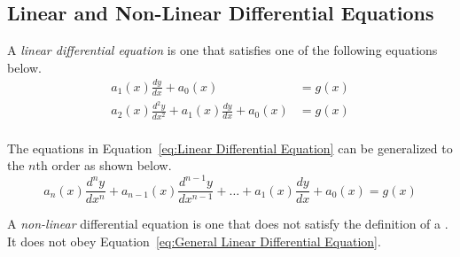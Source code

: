 \subsection{Linear and Non-Linear Differential Equations} \label{Linear vs. Non-Linear Differential Equations}
\begin{definition} \label{def:Linear Differential Equation}
  A \emph{linear differential equation} is one that satisfies one of the following equations below.
  \begin{equation} \label{eq:Linear Differential Equation}
    \begin{aligned}
      a_{1} \left( x \right) \frac{dy}{dx} + a_{0} \left( x \right) &= g \left( x \right) \\
      a_{2} \left( x \right) \frac{d^{2}y}{dx^{2}} + a_{1} \left( x \right) \frac{dy}{dx} + a_{0} \left( x \right) &= g \left( x \right) \\
    \end{aligned}
  \end{equation}
  \begin{remark}
    The equations in Equation~\eqref{eq:Linear Differential Equation} can be generalized to the $n$th order as shown below.
    \begin{equation} \label{eq:General Linear Differential Equation}
      a_{n} \left( x \right) \frac{d^{n}y}{dx^{n}} + a_{n-1} \left( x \right) \frac{d^{n-1}y}{dx^{n-1}} + \ldots + a_{1} \left( x \right) \frac{dy}{dx} + a_{0} \left( x \right) = g \left( x \right)
    \end{equation}
  \end{remark}
\end{definition}
\begin{definition} \label{def:Non-Linear Differential Equation}
  A \emph{non-linear} differential equation is one that does not satisfy the definition of a .
  It does not obey Equation~\eqref{eq:General Linear Differential Equation}.
\end{definition}


